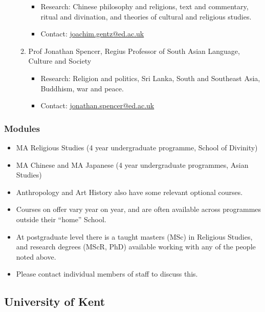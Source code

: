 \documentclass[a4paper,10.5pt]{article}
\begin{document}
\begin{enumerate}
\begin{enumerate}
\begin{itemize}
\item Research: Chinese philosophy and religions, text and commentary, ritual and divination, and theories of cultural and religious studies.\\
\item Contact: \href{mailto:joachim.gentz@ed.ac.uk}{joachim.gentz@ed.ac.uk}\\
\end{itemize}
\item Prof Jonathan Spencer, Regius Professor of South Asian Language, Culture and Society
\label{sec:org566e80e}
\begin{itemize}
\item Research: Religion and politics, Sri Lanka, South and Southeast Asia, Buddhism, war and peace.\\
\item Contact: \href{mailto:jonathan.spencer@ed.ac.uk}{jonathan.spencer@ed.ac.uk}\\
\end{itemize}
\end{enumerate}
\end{enumerate}
\subsubsection{Modules}
\label{sec:org825e3e2}
\begin{itemize}
\item MA Religious Studies (4 year undergraduate programme, School of Divinity)\\
\item MA Chinese and MA Japanese (4 year undergraduate programmes, Asian Studies)\\
\item Anthropology and Art History also have some relevant optional courses.\\
\item Courses on offer vary year on year, and are often available across programmes outside their “home” School.\\
\item At postgraduate level there is a taught masters (MSc) in Religious Studies, and research degrees (MScR, PhD) available working with any of the people noted above.\\
\item Please contact individual members of staff to discuss this.\\
\end{itemize}
\subsection{University of Kent}
\label{sec:orgf9fd859}
\end{document}
